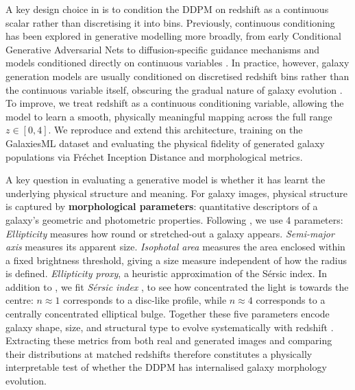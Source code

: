 \documentclass[fleqn,usenatbib]{mnras}
\begin{document}
A key design choice in \citet{lizarraga2024} is to condition the DDPM on redshift as
a continuous scalar rather than discretising it into bins. Previously, continuous conditioning has been explored in generative modelling more broadly, from early Conditional Generative Adversarial Nets \citep{mirzaosindero2014} to diffusion-specific guidance mechanisms \citep{hosalimans2022} and models conditioned directly on continuous variables \citep{ding2024}. In practice, however, galaxy generation models are usually conditioned on discretised redshift bins rather than the continuous variable itself, obscuring the gradual nature of galaxy evolution \citep{li2024}. To improve, we treat redshift as a continuous conditioning variable, allowing the model to learn a
smooth, physically meaningful mapping across the full range $z \in [0, 4]$.
We reproduce and extend this architecture, training on the GalaxiesML dataset
\citep{li2024a} and evaluating the physical fidelity of generated galaxy populations via
Fr\'{e}chet Inception Distance \citep{heusel2017} and morphological metrics.

A key question in evaluating a generative model is whether it has learnt the underlying
physical structure and meaning. For galaxy
images, physical structure is captured by \textbf{morphological parameters}: quantitative
descriptors of a galaxy's geometric and photometric properties. Following \citep{lizarraga2024}, we use 4 parameters: \emph{Ellipticity} measures how round or stretched-out a galaxy appears. \emph{Semi-major axis}  measures its apparent size.  \emph{Isophotal area} measures the area enclosed within a fixed brightness threshold, giving a size measure independent of how the radius is defined. \emph{Ellipticity proxy}, a heuristic approximation of the Sérsic index. In addition to \citep{lizarraga2024},  we fit \emph{Sérsic index} \citep{sersic1963}, to see how concentrated the light is towards the centre: $n\approx 1$
corresponds to a disc-like profile, while $n \approx 4$
corresponds to a centrally concentrated elliptical bulge. Together these five parameters encode galaxy shape, size, and structural type to evolve systematically with redshift \citep{conselice2014, dominguezsanchez2018}.
Extracting these metrics from both real and generated images and comparing their
distributions at matched redshifts therefore constitutes a physically interpretable test
of whether the DDPM has internalised galaxy morphology evolution.
\end{document}
